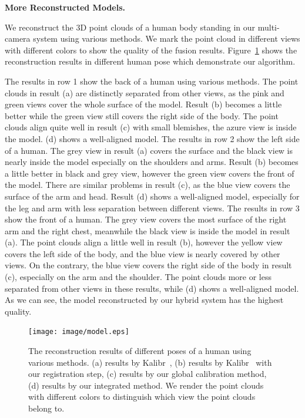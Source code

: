 \noindent \textbf{More Reconstructed Models.}
%


We reconstruct the 3D point clouds of a human body standing in our multi-camera system using various methods.  We mark the point cloud in different views with different colors to show the quality of the fusion results. Figure~\ref{fig:model_poses} shows the reconstruction results in different human pose which demonstrate our algorithm. 

The results in row 1 show the back of a human using various methods. The point clouds in result (a) are distinctly separated from other views, as the pink and green views cover the whole surface of the model. Result (b) becomes a little better while the green view still covers the right side of the body. The point clouds align quite well in result (c) with small blemishes, the azure view is inside the model. (d) shows a well-aligned model. 
The results in row 2 show the left side of a human. The grey view in result (a) covers the surface and the black view is nearly inside the model especially on the shoulders and arms. Result (b) becomes a little better in black and grey view, however the green view covers the front of the model. There are similar problems in result (c), as the blue view covers the surface of the arm and head. Result (d) shows a well-aligned model, especially for the leg and arm with less separation between different views. 
The results in row 3 show the front of a human. The grey view covers the most surface of the right arm and the right chest, meanwhile the black view is inside the model in result (a). The point clouds align a little well in result (b), however the yellow view covers the left side of the body, and the blue view is nearly covered by other views. On the contrary, the blue view covers the right side of the body in result (c), especially on the arm and the shoulder. The point clouds more or less separated from other views in these results, while (d) shows a well-aligned model.
As we can see, the model reconstructed by our hybrid system has the highest quality.
\begin{figure}[ht]
	\centering
	\texttt{[image: image/model.eps]}
	\caption{The reconstruction results of different poses of a human using various methods. (a) results by Kalibr~\cite{Maye2013Self}, (b) results by Kalibr~\cite{Maye2013Self} with our registration step, (c) results by our global calibration method, (d) results by our integrated method. We render the point clouds with different colors to distinguish which view the point clouds belong to.}
	\label{fig:model_poses}
\end{figure}


